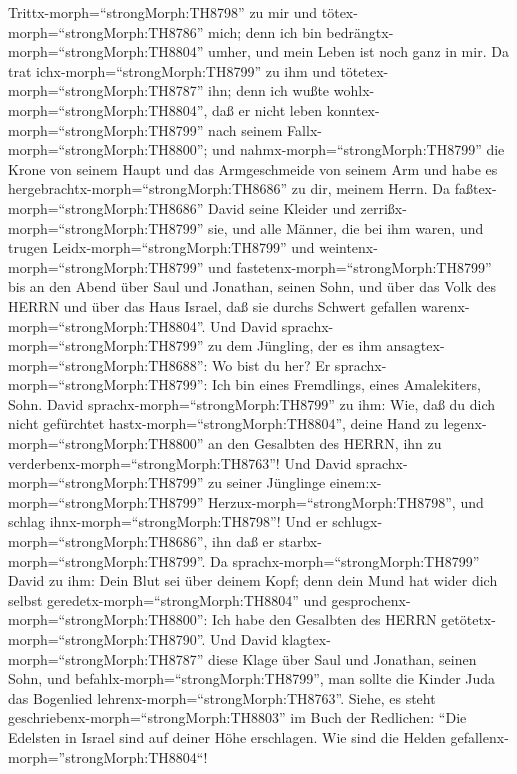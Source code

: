Trittx-morph=``strongMorph:TH8798'' zu mir und
tötex-morph=``strongMorph:TH8786'' mich; denn ich bin
bedrängtx-morph=``strongMorph:TH8804'' umher, und mein Leben ist noch
ganz in mir.  Da trat ichx-morph=``strongMorph:TH8799'' zu
ihm und tötetex-morph=``strongMorph:TH8787'' ihn; denn ich wußte
wohlx-morph=``strongMorph:TH8804'', daß er nicht leben
konntex-morph=``strongMorph:TH8799'' nach seinem
Fallx-morph=``strongMorph:TH8800''; und
nahmx-morph=``strongMorph:TH8799'' die Krone von seinem Haupt und das
Armgeschmeide von seinem Arm und habe es
hergebrachtx-morph=``strongMorph:TH8686'' zu dir, meinem Herrn.
 Da faßtex-morph=``strongMorph:TH8686'' David seine Kleider
und zerrißx-morph=``strongMorph:TH8799'' sie, und alle Männer, die bei
ihm waren,  und trugen Leidx-morph=``strongMorph:TH8799''
und weintenx-morph=``strongMorph:TH8799'' und
fastetenx-morph=``strongMorph:TH8799'' bis an den Abend über Saul und
Jonathan, seinen Sohn, und über das Volk des HERRN und über das Haus
Israel, daß sie durchs Schwert gefallen
warenx-morph=``strongMorph:TH8804''.  Und David
sprachx-morph=``strongMorph:TH8799'' zu dem Jüngling, der es ihm
ansagtex-morph=``strongMorph:TH8688'': Wo bist du her? Er
sprachx-morph=``strongMorph:TH8799'': Ich bin eines Fremdlings, eines
Amalekiters, Sohn.  David
sprachx-morph=``strongMorph:TH8799'' zu ihm: Wie, daß du dich nicht
gefürchtet hastx-morph=``strongMorph:TH8804'', deine Hand zu
legenx-morph=``strongMorph:TH8800'' an den Gesalbten des HERRN, ihn zu
verderbenx-morph=``strongMorph:TH8763''!  Und David
sprachx-morph=``strongMorph:TH8799'' zu seiner Jünglinge
einem:x-morph=``strongMorph:TH8799''
Herzux-morph=``strongMorph:TH8798'', und schlag
ihnx-morph=``strongMorph:TH8798''! Und er
schlugx-morph=``strongMorph:TH8686'', ihn daß er
starbx-morph=``strongMorph:TH8799''.  Da
sprachx-morph=``strongMorph:TH8799'' David zu ihm: Dein Blut sei über
deinem Kopf; denn dein Mund hat wider dich selbst
geredetx-morph=``strongMorph:TH8804'' und
gesprochenx-morph=``strongMorph:TH8800'': Ich habe den Gesalbten des
HERRN getötetx-morph=``strongMorph:TH8790''.  Und David
klagtex-morph=``strongMorph:TH8787'' diese Klage über Saul und Jonathan,
seinen Sohn,  und befahlx-morph=``strongMorph:TH8799'', man
sollte die Kinder Juda das Bogenlied
lehrenx-morph=``strongMorph:TH8763''. Siehe, es steht
geschriebenx-morph=``strongMorph:TH8803'' im Buch der Redlichen:
 ``Die Edelsten in Israel sind auf deiner Höhe erschlagen.
Wie sind die Helden gefallenx-morph=''strongMorph:TH8804``!
